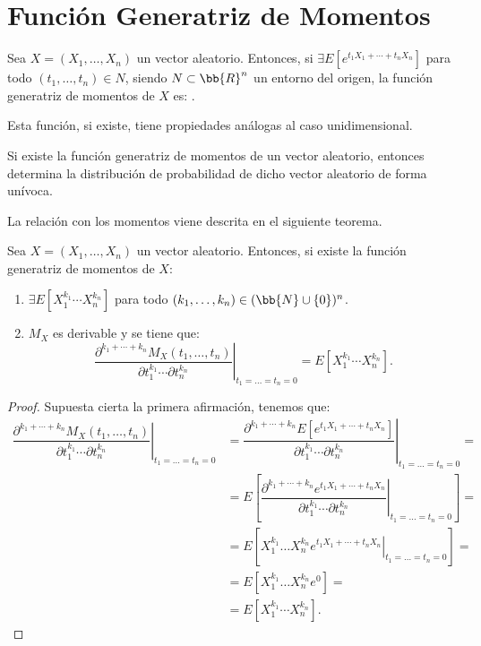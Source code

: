 \section{Función Generatriz de Momentos}

\begin{definicion}
    Sea $X=(X_1,\dots,X_n)$ un vector aleatorio. Entonces, si $\exists E[e^{t_1X_1+\cdots+t_nX_n}]$ para todo $(t_1,\dots,t_n)\in N$, siendo $N\subset \bb{R}^n$ un entorno del origen, la función generatriz de momentos de $X$ es:
    .
\end{definicion}

Esta función, si existe, tiene propiedades análogas al caso unidimensional.
\begin{teo}[Unicidad]
    Si existe la función generatriz de momentos de un vector aleatorio, entonces determina la distribución de probabilidad de dicho vector aleatorio de forma unívoca.
\end{teo}

La relación con los momentos viene descrita en el siguiente teorema.
\begin{teo}
    Sea $X=(X_1,\dots,X_n)$ un vector aleatorio. Entonces, si existe la función generatriz de momentos de $X$:
    \begin{enumerate}
        \item $\exists E[X_1^{k_1}\cdots X_n^{k_n}]$ para todo $(k_1,\dots,k_n)\in (\bb{N}\cup \{0\})^n$.
        \item $M_X$ es derivable y se tiene que:
        \begin{equation*}
            \left.\dfrac{\partial^{k_1+\cdots+k_n} M_X(t_1,\dots,t_n)}{\partial t_1^{k_1}\cdots \partial t_n^{k_n}}\right|_{t_1=\dots=t_n=0} = E[X_1^{k_1}\cdots X_n^{k_n}].
        \end{equation*}
    \end{enumerate}
\end{teo}
\begin{proof}
    Supuesta cierta la primera afirmación, tenemos que:
    \begin{align*}
        \left.\dfrac{\partial^{k_1+\cdots+k_n} M_X(t_1,\dots,t_n)}{\partial t_1^{k_1}\cdots \partial t_n^{k_n}}\right|_{t_1=\dots=t_n=0} &= \left.\dfrac{\partial^{k_1+\cdots+k_n} E[e^{t_1X_1+\cdots+t_nX_n}]}{\partial t_1^{k_1}\cdots \partial t_n^{k_n}}\right|_{t_1=\dots=t_n=0} =\\
        &= E\left[\left.\dfrac{\partial^{k_1+\cdots+k_n} e^{t_1X_1+\cdots+t_nX_n}}{\partial t_1^{k_1}\cdots \partial t_n^{k_n}}\right|_{t_1=\dots=t_n=0}\right] =\\
        &= E\left[\left.X_1^{k_1}\dots X_n^{k_n}e^{t_1X_1+\cdots+t_nX_n}\right|_{t_1=\dots=t_n=0}\right] =\\
        &= E\left[X_1^{k_1}\dots X_n^{k_n}e^{0}\right] =\\
        &= E[X_1^{k_1}\cdots X_n^{k_n}].
    \end{align*}
\end{proof}

